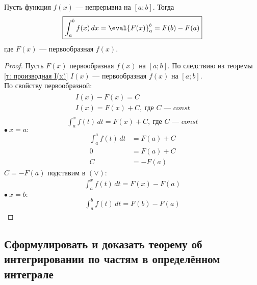 \begin{theorem}
    Пусть функция $f(x)$ --- непрерывна на $[a;b]$. Тогда
    \begin{gather*}
        \boxed{\int_{a}^{b} f(x)\, dx = \eval{F(x)}_{a}^{b} =  F(b) - F(a)}
    \end{gather*}
    где $F(x)$ --- первообразная $f(x)$.
\end{theorem}
\begin{proof}
    Пусть $F(x)$ первообразная $f(x)$ на $[a;b]$. По следствию из теоремы \ref{т: производная I(x)} $I(x)$ --- первообразная $f(x)$ на $[a;b]$. \\
    По свойству первообразной: 
    \begin{gather*}
        \begin{aligned}
            & I(x) - F(x) = C \\ 
            & I(x) = F(x) + C,\ \text{где } C \text{ --- } const
        \end{aligned} \\[1ex]
        \int_{a}^{x} f(t)\, dt = F(x) + C,\ \text{где } C \text{ --- } const \tag{$\vee$}
    \end{gather*}
    $\bullet\ x = a\colon$
    \begin{align*}
        \int_{a}^{a} f(t)\, dt &= F(a) + C \\
        0 &= F(a) + C \\
        C &= -F(a)
    \end{align*}
    $C = -F(a)$ подставим в $(\vee)\colon$
    \begin{gather*}
        \int_{a}^{x} f(t)\, dt = F(x) - F(a)
    \end{gather*}
    $\bullet\ x = b\colon$
    \begin{gather*}
        \boxed{\int_{a}^{b} f(t)\, dt = F(b) - F(a)}
    \end{gather*}
\end{proof}

\newpage
\subsection{Сформулировать и доказать теорему об интегрировании по частям в определённом интеграле}

